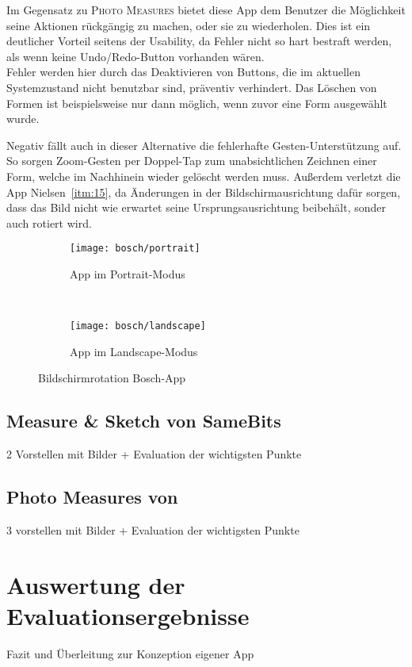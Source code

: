Im Gegensatz zu \textsc{Photo Measures} bietet diese App dem Benutzer die Möglichkeit seine Aktionen rückgängig zu machen, oder sie zu wiederholen. Dies ist ein deutlicher Vorteil seitens der Usability, da Fehler nicht so hart bestraft werden, als wenn keine Undo/Redo-Button vorhanden wären. \\

Fehler werden hier durch das Deaktivieren von Buttons, die im aktuellen Systemzustand nicht benutzbar sind, präventiv verhindert. Das Löschen von Formen ist beispielsweise nur dann möglich, wenn zuvor eine Form ausgewählt wurde.

Negativ fällt auch in dieser Alternative die fehlerhafte Gesten-Unterstützung auf. So sorgen Zoom-Gesten per Doppel-Tap zum unabsichtlichen Zeichnen einer Form, welche im Nachhinein wieder gelöscht werden muss. Außerdem verletzt die App Nielsen~\ref{itm:15}, da Änderungen in der Bildschirmausrichtung dafür sorgen, dass das Bild nicht wie erwartet seine Ursprungsausrichtung beibehält, sonder auch rotiert wird. 

\begin{figure}[h]
	\begin{subfigure}[b]{0.5\textwidth}
		\texttt{[image: bosch/portrait]}
		\caption{App im Portrait-Modus}
		\label{fig:bportait}	
	\end{subfigure}
	~
	\begin{subfigure}[b]{0.5\textwidth}
		\texttt{[image: bosch/landscape]}
		\caption{App im Landscape-Modus}
		\label{fig:blandscape}	
	\end{subfigure}
	\caption{Bildschirmrotation Bosch-App}
	\label{fig:borientation}
\end{figure}

\subsection{Measure \& Sketch von SameBits}
2 Vorstellen mit Bilder + Evaluation der wichtigsten Punkte
\subsection{Photo Measures von }
3 vorstellen mit Bilder + Evaluation der wichtigsten Punkte

\section{Auswertung der Evaluationsergebnisse}
Fazit und Überleitung zur Konzeption eigener App

